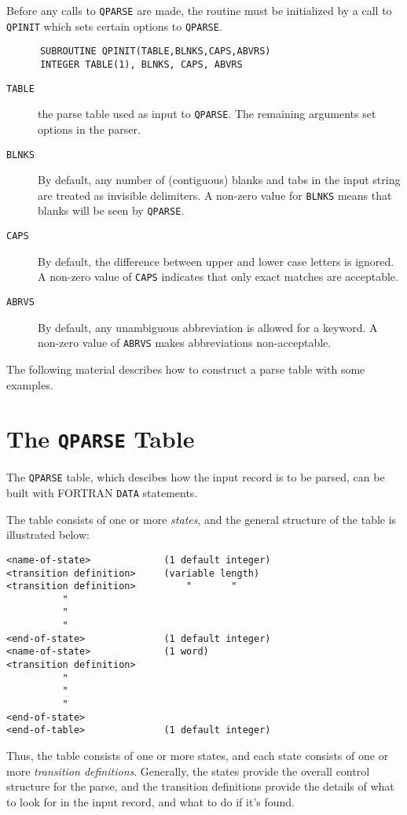 Before any calls to {\tt QPARSE} are made,
the routine must be initialized by a call to
{\tt QPINIT} which sets certain options to {\tt QPARSE}.
\begin{verbatim}
      SUBROUTINE QPINIT(TABLE,BLNKS,CAPS,ABVRS)
      INTEGER TABLE(1), BLNKS, CAPS, ABVRS
\end{verbatim}
\begin{description}
\item[{\tt TABLE}] the parse table used as input to {\tt QPARSE}. The
remaining arguments set options in the parser. 
\item[{\tt BLNKS}]   By default, 
any number of (contiguous) blanks and tabs in the input string are treated
as invisible delimiters.
A non-zero value for {\tt BLNKS} means that
blanks will be seen by {\tt QPARSE}.
\item[{\tt CAPS}]     By default, the difference between upper and lower case
letters is ignored. A non-zero value of {\tt CAPS} indicates that
only exact matches are acceptable. 
\item[{\tt ABRVS}] By default, any unambiguous abbreviation is allowed for
a keyword. A non-zero value of {\tt ABRVS} makes abbreviations
non-acceptable.
\end{description}
The following material describes how to construct a
parse table with some examples.
\section{\sf The {\tt QPARSE} Table}
The {\tt QPARSE} table, which descibes how the input record is to be
parsed, can be built with FORTRAN {\tt DATA} statements. 

The table consists
of one or more {\em states}, and the general structure of the table is
illustrated below:
\newpage
\begin{center}
\begin{verbatim}
<name-of-state>             (1 default integer)
<transition definition>     (variable length)
<transition definition>         "       "
          "
          "
          "
<end-of-state>              (1 default integer)
<name-of-state>             (1 word)
<transition definition>
          "
          "
          "
<end-of-state>
<end-of-table>              (1 default integer)
\end{verbatim}
\end{center}
Thus, the table consists of one or more states, and each state
consists of one or more {\em transition definitions}. Generally, the states
provide the overall control structure for the parse, and the transition
definitions provide the details of what to look for in the input record,
and what to do if it's found.

